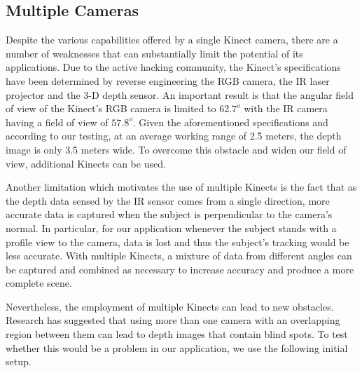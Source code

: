 \documentclass[11pt,a4paper]{article}
\begin{document}
\subsection{Multiple Cameras}
\noindent
Despite the various capabilities offered by a single Kinect camera, there are a number of weaknesses that can substantially limit the potential of its applications. Due to the active hacking community, the Kinect's specifications have been determined by reverse engineering the RGB camera, the IR laser projector and the 3-D depth sensor. An important result is that the angular field of view of the Kinect's RGB camera is limited to $62.7^o$ with the IR camera having a field of view of $57.8^o$. Given the aforementioned specifications and according to our testing, at an average working range of 2.5 meters, the depth image is only 3.5 meters wide. To overcome this obstacle and widen our field of view, additional Kinects can be used. 
 
\noindent
Another limitation which motivates the use of multiple Kinects is the fact that as the depth data sensed by the IR sensor comes from a single direction, more accurate data is captured when the subject is perpendicular to the camera's normal. In particular, for our application whenever the subject stands with a profile view to the camera, data is lost and thus the subject's tracking would be less accurate. With multiple Kinects, a mixture of data from different angles can be captured and combined as necessary to increase accuracy and produce a more complete scene.
 
\noindent
Nevertheless, the employment of multiple Kinects can lead to new obstacles. Research has suggested that using more than one camera with an overlapping region between them can lead to depth images that contain blind spots. To test whether this would be a problem in our application, we use the following initial setup.
\end{document}
